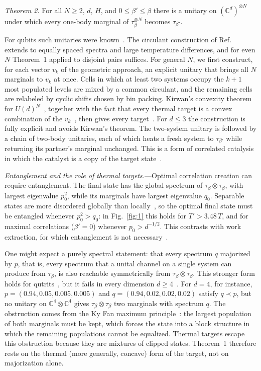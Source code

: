 \documentclass[aps,prl,reprint,superscriptaddress,amsmath,amssymb]{revtex4-2}
\newcommand{\C}{\mathbb{C}}
\begin{document}
\textit{Theorem 2.} For all $N\ge2$, $d$, $H$, and $0\le\beta'\le\beta$ there is a unitary on $(\C^d)^{\otimes N}$
under which every one-body marginal of $\tau_\beta^{\otimes N}$ becomes $\tau_{\beta'}$.

For qubits such unitaries were known~\cite{PerarnauLlobet2015}. The circulant construction of Ref.~\cite{Huber2015}
extends to equally spaced spectra and large temperature differences, and for even $N$ Theorem~1 applied to disjoint
pairs suffices. For general $N$, we first construct, for each vector $v_k$ of the geometric approach, an explicit
unitary that brings all $N$ marginals to $v_k$ at once. Cells in which at least two systems occupy the $k+1$ most
populated levels are mixed by a common circulant, and the remaining cells are relabeled by cyclic shifts chosen by
bin packing. Kirwan's convexity theorem for $U(d)^N$~\cite{Kirwan1984,Christandl2014}, together with the fact that
every thermal target is a convex combination of the $v_k$~\cite{Bakhshinezhad2019}, then gives every target~\cite{SM}.
For $d\le3$ the construction is fully explicit and avoids Kirwan's theorem. The two-system unitary is followed by a
chain of two-body unitaries, each of which heats a fresh system to $\tau_{\beta'}$ while returning its partner's
marginal unchanged. This is a form of correlated catalysis~\cite{Boes2019,ShiraishiSagawa2021,Wilming2022} in which
the catalyst is a copy of the target state~\cite{SM}.

\textit{Entanglement and the role of thermal targets.}---Optimal correlation creation can require entanglement. The
final state has the global spectrum of $\tau_\beta\otimes\tau_\beta$, with largest eigenvalue $p_0^2$, while its
marginals have largest eigenvalue $q_0$. Separable states are more disordered globally than
locally~\cite{NielsenKempe2001}, so the optimal final state must be entangled whenever $p_0^2>q_0$: in
Fig.~\ref{fig:1} this holds for $T'>3.48\,T$, and for maximal correlations ($\beta'=0$) whenever $p_0>d^{-1/2}$. This
contrasts with work extraction, for which entanglement is not necessary~\cite{Hovhannisyan2013}.

One might expect a purely spectral statement: that every spectrum $q$ majorized by $p$, that is, every spectrum that a
unital channel on a single system can produce from $\tau_\beta$, is also reachable symmetrically from
$\tau_\beta\otimes\tau_\beta$. This stronger form holds for qutrits~\cite{Bakhshinezhad2019}, but it fails in every
dimension $d\ge4$~\cite{SM}. For $d=4$, for instance, $p=(0.94,0.05,0.005,0.005)$ and $q=(0.94,0.02,0.02,0.02)$ satisfy
$q\prec p$, but no unitary on $\C^4\otimes\C^4$ gives $\tau_\beta\otimes\tau_\beta$ two marginals with spectrum $q$. The
obstruction comes from the Ky Fan maximum principle~\cite{Bhatia1997}: the largest population of both marginals must
be kept, which forces the state into a block structure in which the remaining populations cannot be equalized.
Thermal targets escape this obstruction because they are mixtures of clipped states. Theorem~1 therefore rests on the
thermal (more generally, concave) form of the target, not on majorization alone.
\end{document}
